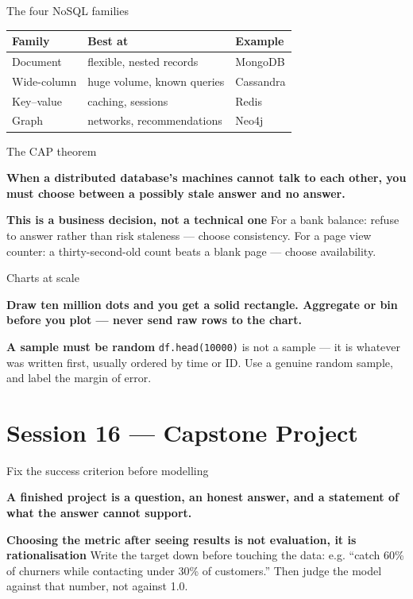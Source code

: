 \documentclass[10pt,aspectratio=169]{beamer}
\newcommand{\keyidea}[1]{%
  \begin{block}{}
  \centering\Large\bfseries\color{dsblue} #1
  \end{block}%
}
\newcommand{\trapbox}[2]{%
  \begin{alertblock}{\textbf{#1}}
  #2
  \end{alertblock}%
}
\begin{document}
\begin{frame}{The four NoSQL families}
\begin{table}
\small
\begin{tabularx}{\linewidth}{@{}lXl@{}}
\toprule
\textbf{Family} & \textbf{Best at} & \textbf{Example} \\
\midrule
Document & flexible, nested records & MongoDB \\
Wide-column & huge volume, known queries & Cassandra \\
Key--value & caching, sessions & Redis \\
Graph & networks, recommendations & Neo4j \\
\bottomrule
\end{tabularx}
\end{table}
\end{frame}

\begin{frame}{The CAP theorem}
\keyidea{When a distributed database's machines cannot talk to each other, you must choose between a possibly stale answer and no answer.}
\trapbox{This is a business decision, not a technical one}{For a bank balance: refuse to answer rather than risk staleness --- choose consistency. For a page view counter: a thirty-second-old count beats a blank page --- choose availability.}
\end{frame}

\begin{frame}{Charts at scale}
\keyidea{Draw ten million dots and you get a solid rectangle. Aggregate or bin before you plot --- never send raw rows to the chart.}
\trapbox{A sample must be random}{\texttt{df.head(10000)} is not a sample --- it is whatever was written first, usually ordered by time or ID. Use a genuine random sample, and label the margin of error.}
\end{frame}

\section{Session 16 --- Capstone Project}

\begin{frame}{Fix the success criterion before modelling}
\keyidea{A finished project is a question, an honest answer, and a statement of what the answer cannot support.}
\trapbox{Choosing the metric after seeing results is not evaluation, it is rationalisation}{Write the target down before touching the data: e.g. ``catch 60\% of churners while contacting under 30\% of customers.'' Then judge the model against that number, not against 1.0.}
\end{frame}
\end{document}
